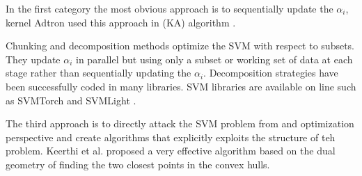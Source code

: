 In the first category the most obvious approach is to sequentially update the $\alpha_i$,  kernel Adtron  used this approach in (KA) algorithm \cite{kernelSVM4}. 

Chunking and decomposition methods optimize the SVM with respect to subsets. They update $\alpha_i$ in parallel but using only a subset or working set of data at each stage rather than sequentially updating the $\alpha_i$. Decomposition strategies have been successfully coded in many libraries. SVM libraries are available on line such as SVMTorch \cite{svmTorch} and SVMLight \cite{SVMlight}. 


The third approach is to directly attack the SVM  problem from and optimization perspective and create algorithms that explicitly exploits the structure of teh problem. Keerthi et al. \cite{fastSVM6} proposed a very effective algorithm based on the dual geometry of finding the two closest points in the convex hulls. 
 

%
 
